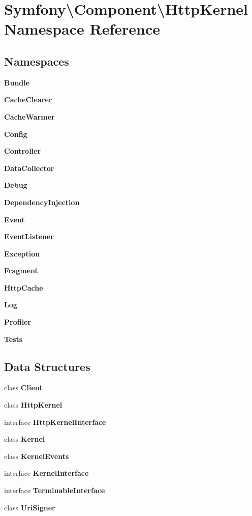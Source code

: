 \section{Symfony\textbackslash{}Component\textbackslash{}Http\+Kernel Namespace Reference}
\label{namespace_symfony_1_1_component_1_1_http_kernel}
\subsection*{Namespaces}
\begin{DoxyCompactItemize}
\item 
 {\bf Bundle}
\item 
 {\bf Cache\+Clearer}
\item 
 {\bf Cache\+Warmer}
\item 
 {\bf Config}
\item 
 {\bf Controller}
\item 
 {\bf Data\+Collector}
\item 
 {\bf Debug}
\item 
 {\bf Dependency\+Injection}
\item 
 {\bf Event}
\item 
 {\bf Event\+Listener}
\item 
 {\bf Exception}
\item 
 {\bf Fragment}
\item 
 {\bf Http\+Cache}
\item 
 {\bf Log}
\item 
 {\bf Profiler}
\item 
 {\bf Tests}
\end{DoxyCompactItemize}
\subsection*{Data Structures}
\begin{DoxyCompactItemize}
\item 
class {\bf Client}
\item 
class {\bf Http\+Kernel}
\item 
interface {\bf Http\+Kernel\+Interface}
\item 
class {\bf Kernel}
\item 
class {\bf Kernel\+Events}
\item 
interface {\bf Kernel\+Interface}
\item 
interface {\bf Terminable\+Interface}
\item 
class {\bf Uri\+Signer}
\end{DoxyCompactItemize}
